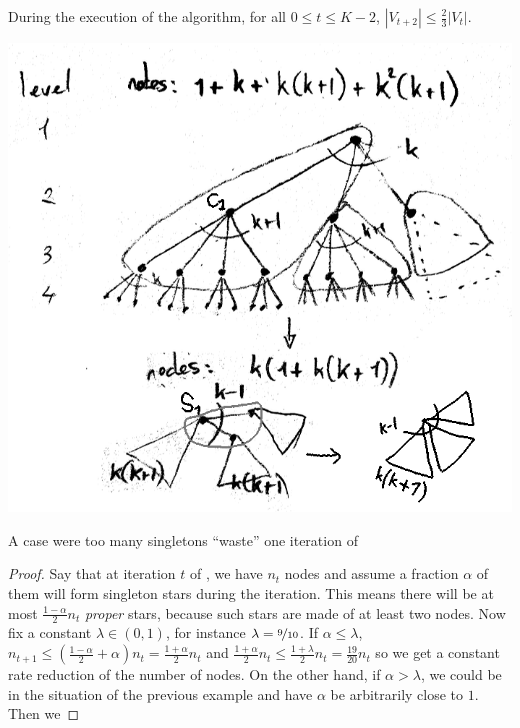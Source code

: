 {\color{blue}{\large the following is actually incorrect but I leave it for now for illustration
purpose}

\begin{lemma}
  \label{lemma:gtx_lessnodes}
  During the execution of the \gtx{} algorithm, for all $0\leq t \leq K-2$, $|V_{t+2}| \leq
  \frac{2}{3}|V_t|$.
\end{lemma}
\begin{marginfigure}
  \centering
  \includegraphics[width=\linewidth]{assets/raw/lots_of_singletons_bw.png}
  \caption{A case were too many singletons \enquote{waste} one iteration of \gtx{}}
  \label{fig:gtx_manysingles}
\end{marginfigure}
\begin{proof}
  Say that at iteration $t$ of \gtx{}, we have $n_t$ nodes and assume a fraction $\alpha$ of them
  will form singleton stars during the \tth{} iteration. This means there will be at most $\frac{1-\alpha}{2}n_t$
  \emph{proper} stars, because such stars are made of at least two nodes. Now fix a constant
  $\lambda \in (0,1)$, for instance $\lambda = \nicefrac{9}{10}$. If $\alpha \leq \lambda$, $n_{t+1}
  \leq (\frac{1-\alpha}{2} + \alpha)n_t = \frac{1+\alpha}{2}n_t$ and $\frac{1+\alpha}{2}n_t \leq
  \frac{1+\lambda}{2}n_t = \frac{19}{20}n_t$ so we get a
  constant rate reduction of the number of nodes. On the other hand, if $\alpha > \lambda$, we could
  be in the situation of the previous example and have $\alpha$ be arbitrarily close to $1$. Then we

\end{proof}}
